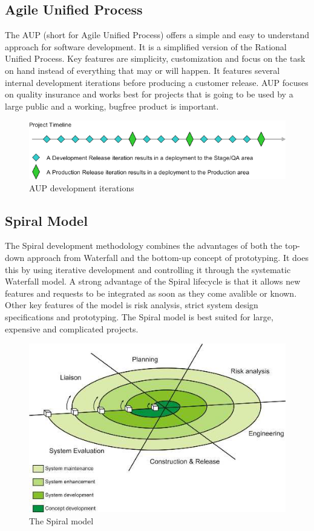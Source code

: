 \subsection{Agile Unified Process}
The AUP (short for Agile Unified Process) offers a simple and easy to understand approach for software
development. It is a simplified version of the Rational Unified Process. Key features are simplicity, 
customization and focus on the task on hand instead of everything that may or will happen. It features 
several internal development iterations before producing a customer release. AUP focuses on quality
insurance and works best for projects that is going to be used by a large public and a working, bugfree
product is important.
\begin{figure}[h!]
\centering \includegraphics[scale=0.65]{img/designmodel-aup} \caption{AUP development iterations}
\label{fig:desigmodel-aupl}
\end{figure}

\subsection{Spiral Model}
The Spiral development methodology combines the advantages of both the top-down approach from 
Waterfall and the bottom-up concept of prototyping. It does this by using iterative development and
controlling it through the systematic Waterfall model. A strong advantage of the Spiral lifecycle is that it
allows new features and requests to be integrated as soon as they come avalible or known. Other key 
features of the model is risk analysis, strict system design specifications and prototyping. The Spiral model
 is best suited for large, expensive and complicated projects.
\begin{figure}[h!]
\centering \includegraphics[scale=0.85]{img/designmodel-spiral} \caption{The Spiral model}
\label{fig:desigmodel-spiral}
\end{figure}

